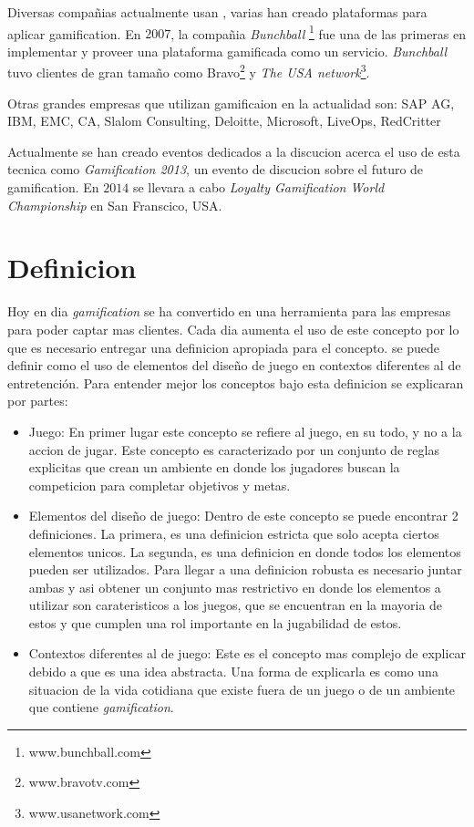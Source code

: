 Diversas compañias actualmente usan {\GAM}, varias han creado plataformas para aplicar gamification.
En $2007$, la compañia \emph{Bunchball} \footnote{www.bunchball.com} fue una de las primeras en implementar y proveer
una plataforma gamificada como un servicio\cite{Gam:Bunchball:1}. \emph{Bunchball} tuvo clientes de gran tamaño como
Bravo\footnote{www.bravotv.com} y \emph{The USA network}\footnote{www.usanetwork.com}\cite{Gam:Bunchball:2}.

Otras grandes empresas que utilizan gamificaion en la actualidad son: SAP AG, IBM, EMC, CA, Slalom Consulting,
 Deloitte, Microsoft, LiveOps, RedCritter\cite{Gam:Companies:1}  

Actualmente se han creado eventos dedicados a la discucion acerca el uso de esta tecnica como
\emph{Gamification 2013}, un evento de discucion sobre el futuro de gamification\cite{Gam:Events:1}. 
En $2014$ se llevara a cabo \emph{Loyalty Gamification World Championship} en San Franscico, USA.\cite{Gam:Events:2}

\section{Definicion}

Hoy en dia \emph{gamification} se ha convertido en una herramienta para las empresas 
para poder captar mas clientes. Cada dia aumenta el uso de este concepto por lo que es
necesario entregar una definicion apropiada para el concepto.{\GAM} se puede definir
como el uso de elementos del diseño de juego en contextos diferentes al de entretención. Para entender mejor 
los conceptos bajo esta definicion se explicaran por partes:

\begin{itemize}

\item Juego: En primer lugar este concepto se refiere al juego, en su todo, y no a la accion de jugar.
Este concepto es caracterizado por un conjunto de reglas explicitas que crean un ambiente  
en donde los jugadores buscan la competicion para completar objetivos y metas.

\item Elementos del diseño de juego: Dentro de este concepto se puede encontrar 2 definiciones.
La primera, es una definicion estricta que solo acepta ciertos elementos unicos. La segunda, 
es una definicion en donde todos los elementos pueden ser utilizados. Para llegar a una 
definicion robusta es necesario juntar ambas y asi obtener un conjunto mas restrictivo en donde 
los elementos a utilizar son carateristicos a los juegos, que se encuentran en la mayoria de estos y 
que cumplen una rol importante en la jugabilidad de estos.

\item Contextos diferentes al de juego: Este es el concepto mas complejo de explicar debido a que es una idea  
abstracta. Una forma de explicarla es como una situacion de la vida cotidiana que existe fuera 
de un juego o de un ambiente que contiene \emph{gamification}.

\end{itemize}

